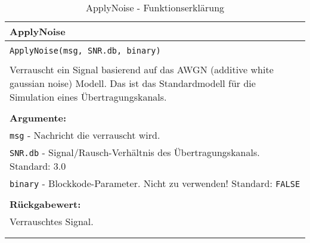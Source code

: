 \begin{longtable}{|p{\textwidth}|}
\hline
\rowcolor{lightblue}
ApplyNoise\\
\hline
\\
\texttt{ApplyNoise(msg, SNR.db, binary)}\\
\\
Verrauscht ein Signal basierend auf das AWGN (additive white gaussian noise) Modell. Das ist das Standardmodell für die Simulation eines Übertragungskanals.\\
\\
\textbf{Argumente:}\\
\texttt{msg} - Nachricht die verrauscht wird.\\
\texttt{SNR.db} - Signal/Rausch-Verhältnis des Übertragungskanals. Standard: 3.0\\
\texttt{binary} - Blockkode-Parameter. Nicht zu verwenden! Standard: \texttt{FALSE}\\
\\
\textbf{Rückgabewert:}\\
Verrauschtes Signal.\\
\\
\hline
\caption[ApplyNoise]{ApplyNoise - Funktionserklärung}
\end{longtable}
